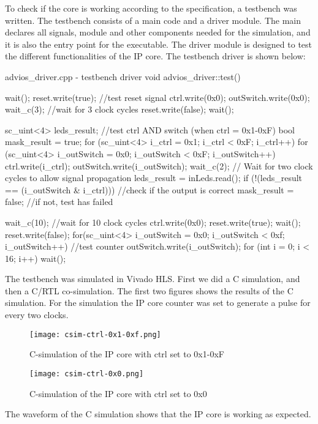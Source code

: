 \documentclass[../main.tex]{subfiles}
\begin{document}
\newpage
To check if the core is working according to the specification, a testbench was written. The testbench consists of a main code
and a driver module. 
The main declares all signals, module and other components needed for the simulation, and it is also the entry point for the executable. The driver module is designed to test
the different functionalities of the IP core. The testbench driver is shown below:
\begin{myminted}{advios\_driver.cpp - testbench driver}
void advios_driver::test(){
	wait();
	reset.write(true); //test reset signal
	ctrl.write(0x0);
	outSwitch.write(0x0);
	wait_c(3); //wait for 3 clock cycles
	reset.write(false);
	wait();

	sc_uint<4> leds_result; //test ctrl AND switch (when ctrl = 0x1-0xF)
	bool mask_result = true;
	for (sc_uint<4> i_ctrl = 0x1; i_ctrl < 0xF; i_ctrl++) {
	    for (sc_uint<4> i_outSwitch = 0x0; i_outSwitch < 0xF; i_outSwitch++) {
	        ctrl.write(i_ctrl);
	        outSwitch.write(i_outSwitch);
	        wait_c(2);  // Wait for two clock cycles to allow signal propagation
	        leds_result = inLeds.read();
	        if (!(leds_result == (i_outSwitch & i_ctrl))) { //check if the output is correct
	            mask_result = false; //if not, test has failed
	        }
	    }
	}

	wait_c(10); //wait for 10 clock cycles
	ctrl.write(0x0);
	reset.write(true);
	wait();
	reset.write(false);
	for(sc_uint<4> i_outSwitch = 0x0; i_outSwitch < 0xf; i_outSwitch++){ //test counter
		outSwitch.write(i_outSwitch);
		for (int i = 0; i < 16; i++){
			wait();
		}
	}
}
\end{myminted}
\newpage
The testbench was simulated in Vivado HLS. First we did a C simulation, and then a C/RTL co-simulation. The first two figures shows the results of the C simulation.
For the simulation the IP core counter was set to generate a pulse for every two clocks. 
\begin{figure}[h]
    \centering
    \texttt{[image: csim-ctrl-0x1-0xf.png]}
    \caption{C-simulation of the IP core with ctrl set to 0x1-0xF}
\end{figure}

\begin{figure}[h]
    \centering
    \texttt{[image: csim-ctrl-0x0.png]}
    \caption{C-simulation of the IP core with ctrl set to 0x0}
\end{figure}
\par
The waveform of the C simulation shows that the IP core is working as expected.
\end{document}
